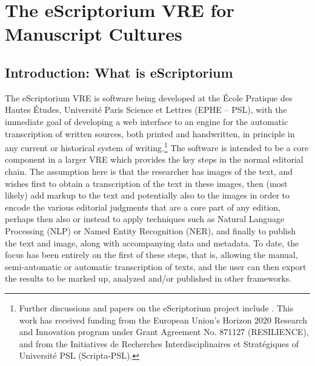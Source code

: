 ﻿\chapter{The eScriptorium VRE for Manuscript Cultures}

\section{Introduction: What is eScriptorium}

The eScriptorium VRE is software being developed at the École Pratique des
Hautes Études, Université Paris Science et Lettres (EPHE – PSL), with the
immediate goal of developing a web interface to an engine for the automatic
transcription of written sources, both printed and handwritten, in principle in
any current or historical system of writing.\footnote{Further discussions and
papers on the eScriptorium project include
\cite{kiessling2019kraken,KiesslingEtAl2019eScrip, kiessling2019badam,
stokes2020escriptorium}. This work has received funding from the European
Union’s Horizon 2020 Research and Innovation program under Grant Agreement No.
871127 (RESILIENCE), and from the Initiatives de Recherches Interdisciplinaires
et Stratégiques of Université PSL (Scripta-PSL).} The software is intended to
be a core component in a larger VRE which provides the key steps in the normal
editorial chain. The assumption here is that the researcher has images of the
text, and wishes first to obtain a transcription of the text in these images,
then (most likely) add markup to the text and potentially also to the images in
order to encode the various editorial judgments that are a core part of any
edition, perhaps then also or instead to apply techniques such as Natural
Language Processing (NLP) or Named Entity Recognition (NER), and finally to
publish the text and image, along with accompanying data and metadata. To date,
the focus has been entirely on the first of these steps, that is, allowing the
manual, semi-automatic or automatic transcription of texts, and the user can
then export the results to be marked up, analyzed and/or published in other
frameworks.

